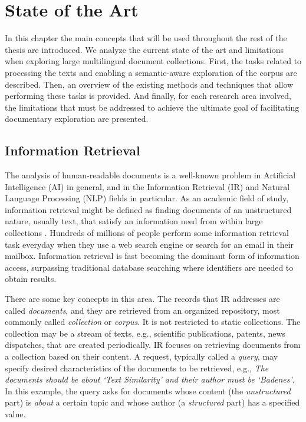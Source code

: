 

\chapter{State of the Art}\label{ch:soa}

\graphicspath{{soa/figures/}}


In this chapter the main concepts that will be used throughout the rest of the thesis are introduced. 
We analyze the current state of the art and limitations when exploring large multilingual document collections. First, the tasks related to processing the texts and enabling a semantic-aware exploration of the corpus are described. Then, an overview of the existing methods and techniques that allow performing these tasks is provided. And finally, for each research area involved, the limitations that must be addressed to achieve the ultimate goal of facilitating documentary exploration are presented. 

\section{Information Retrieval}

The analysis of human-readable documents is a well-known problem in Artificial Intelligence (AI) in general, and in the Information Retrieval (IR) and Natural Language Processing (NLP) fields in particular. As an academic field of study, information retrieval might be defined as finding documents of an unstructured nature, usually text, that satisfy an information need from within large collections \citep{manning2008}. Hundreds of millions of people perform some information retrieval task everyday when they use a web search engine or search for an email in their mailbox. Information retrieval is fast becoming the dominant form of information access, surpassing traditional database searching where identifiers are needed to obtain results. 

There are some key concepts in this area.  The  records  that  IR  addresses  are  called \textit{documents}, and they are retrieved from an organized repository, most commonly called  \textit{collection} or \textit{corpus}. It is not restricted to static collections. The collection may be a stream of texts, e.g., scientific publications, patents, news dispatches, that are created periodically. IR focuses on retrieving documents from a collection based on their content. A request, typically called a \textit{query},  may specify desired characteristics of the documents to be retrieved, e.g., \textit{The documents should be about ‘Text Similarity’ and their author must be ‘Badenes’}. In this example, the query asks for documents whose content (the \textit{unstructured} part) is \textit{about} a certain topic and whose author (a \textit{structured} part) has a specified value. 

